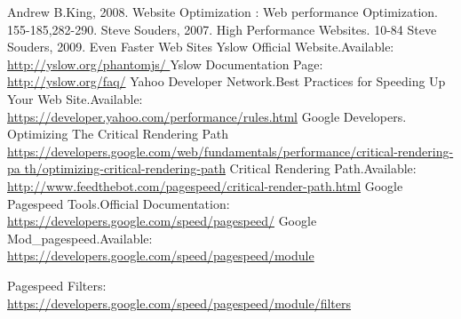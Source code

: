 \documentclass[conference]{IEEEtran}
\begin{document}
\begin{thebibliography}{1}
Andrew B.King, 2008. Website Optimization : Web performance
Optimization. 155-185,282-290.
Steve Souders, 2007.  High Performance Websites. 10-84
Steve Souders, 2009. Even Faster Web Sites 
Yslow Official Website.Available:\\
\href{http://yslow.org/phantomjs/}{http://yslow.org/phantomjs/
}
Yslow Documentation Page:\\
\href{http://yslow.org/faq/}{http://yslow.org/faq/}
Yahoo Developer Network.Best Practices for Speeding Up Your Web
Site.Available:\\
\href{https://developer.yahoo.com/performance/rules.html}{
https://developer.yahoo.com/performance/rules.html}
Google Developers. Optimizing The Critical Rendering
Path\\
\href{
https://developers.google.com/web/fundamentals/performance/critical-rendering-pa
th/optimizing-critical-rendering-path}{
https://developers.google.com/web/fundamentals/performance/critical-rendering-pa
th/optimizing-critical-rendering-path}
Critical Rendering Path.Available:\\
\href{
http://www.feedthebot.com/pagespeed/critical-render-path.html}{
http://www.feedthebot.com/pagespeed/critical-render-path.html}
Google Pagespeed Tools.Official Documentation:\\
\href{https://developers.google.com/speed/pagespeed/}{
https://developers.google.com/speed/pagespeed/}
Google Mod\_pagespeed.Available:\\
\href{
https://developers.google.com/speed/pagespeed/module}{
https://developers.google.com/speed/pagespeed/module}
 
Pagespeed Filters:\\
\href{https://developers.google.com/speed/pagespeed/module/filters}
{https://developers.google.com/speed/pagespeed/module/filters}

\end{thebibliography}
\end{document}
